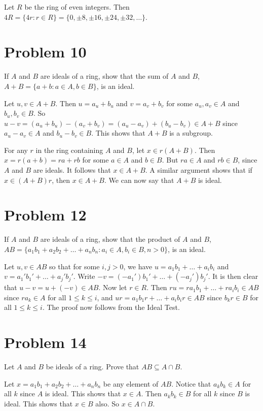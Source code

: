 \documentclass{article}
\begin{document}
Let $R$ be the ring of even integers.
Then $4R=\{4r:r\in R\}=\{0,\pm 8, \pm 16, \pm 24, \pm 32, \dots\}$.

\section*{Problem 10}

If $A$ and $B$ are ideals of a ring, show that the sum of $A$ and
$B$, $A+B=\{a+b:a\in A,b\in B\}$, is an ideal.

Let $u,v\in A+B$.  Then $u=a_u+b_u$ and $v=a_v+b_v$ for some
$a_u,a_v\in A$ and $b_u,b_v\in B$.  So
$u-v=(a_u+b_u)-(a_v+b_v)=(a_u-a_v)+(b_u-b_v)\in A+B$ since
$a_u-a_v\in A$ and $b_u-b_v\in B$.  This shows that $A+B$ is
a subgroup.

For any $r$ in the ring containing $A$ and $B$,
let $x\in r(A+B)$.  Then $x=r(a+b)=ra+rb$ for some $a\in A$ and $b\in B$.
But $ra\in A$ and $rb\in B$, since $A$ and $B$ are ideals.
It follows that $x\in A+B$.  A similar argument shows that if
$x\in (A+B)r$, then $x\in A+B$.  We can now say that $A+B$ is ideal.

\section*{Problem 12}

If $A$ and $B$ are ideals of a ring, show that the product of $A$ and $B$,
$AB=\{a_1b_1+a_2b_2+\dots+a_nb_n:a_i\in A,b_i\in B,n>0\}$, is an ideal.

Let $u,v\in AB$ so that for some $i,j>0$, we have $u=a_1b_1+\dots+a_ib_i$ and
$v=a_1'b_1'+\dots+a_j'b_j'$.  Write $-v=(-a_1')b_1'+\dots+(-a_j')b_j'$.
It is then clear that $u-v=u+(-v)\in AB$.
Now let $r\in R$.  Then $ru=ra_1b_1+\dots+ra_ib_i\in AB$ since
$ra_k\in A$ for all $1\leq k\leq i$, and $ur=a_1b_1r+\dots+a_ib_ir\in AB$
since $b_kr\in B$ for all $1\leq k\leq i$.  The proof now follows from
the Ideal Test.

\section*{Problem 14}

Let $A$ and $B$ be ideals of a ring.  Prove that $AB\subseteq A\cap B$.

Let $x=a_1b_1+a_2b_2+\dots+a_nb_n$ be any element of $AB$.
Notice that $a_kb_k\in A$ for all $k$ since $A$ is ideal.
This shows that $x\in A$.
Then $a_kb_k\in B$ for all $k$ since $B$ is ideal.
This shows that $x\in B$ also.
So $x\in A\cap B$.
\end{document}
